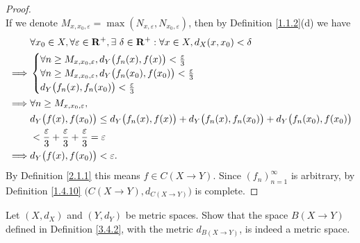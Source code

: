 \begin{proof}
\[    \]
    If we denote \(M_{x, x_0, \varepsilon} = \max(N_{x, \varepsilon}, N_{x_0, \varepsilon})\), then by Definition \ref{1.1.2}(d) we have
    \begin{align*}
                 & \forall x_0 \in X, \forall \varepsilon \in \mathbf{R}^+, \exists\ \delta \in \mathbf{R}^+ : \forall x \in X, d_X(x, x_0) < \delta        \\
        \implies & \begin{cases}
                       \forall n \geq M_{x, x_0, \varepsilon}, d_Y\big(f_n(x), f(x)\big) < \frac{\varepsilon}{3}     \\
                       \forall n \geq M_{x, x_0, \varepsilon}, d_Y\big(f_n(x_0), f(x_0)\big) < \frac{\varepsilon}{3} \\
                       d_Y\big(f_n(x), f_n(x_0)\big) < \frac{\varepsilon}{3}
                   \end{cases}                            \\
        \implies & \forall n \geq M_{x, x_0, \varepsilon},                                                                                  \\
                 & d_Y\big(f(x), f(x_0)\big) \leq d_Y\big(f_n(x), f(x)\big) + d_Y\big(f_n(x), f_n(x_0)\big) + d_Y\big(f_n(x_0), f(x_0)\big) \\
                 & < \frac{\varepsilon}{3} + \frac{\varepsilon}{3} + \frac{\varepsilon}{3} = \varepsilon                                    \\
        \implies & d_Y\big(f(x), f(x_0)\big) < \varepsilon.
    \end{align*}
    By Definition \ref{2.1.1} this means \(f \in C(X \to Y)\).
    Since \((f_n)_{n = 1}^\infty\) is arbitrary, by Definition \ref{1.4.10} \(\big(C(X \to Y), d_{C(X \to Y)}\big)\) is complete.
\end{proof}

\exercisesection

\begin{exercise}\label{ex 3.4.1}
    Let \((X, d_X)\) and \((Y, d_Y)\) be metric spaces.
    Show that the space \(B(X \to Y)\) defined in Definition \ref{3.4.2}, with the metric \(d_{B(X \to Y)}\), is indeed a metric space.
\end{exercise}

